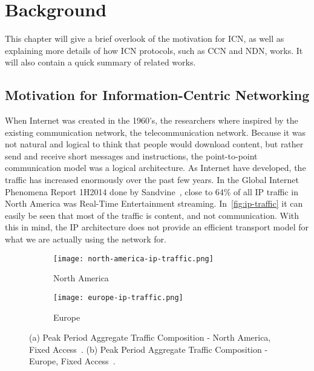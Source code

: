 \chapter{Background}\label{chp:background} 

This chapter will give a brief overlook of the motivation for \gls{ICN},
as well as explaining more details of how \gls{ICN} protocols, such as \gls{CCN} and \gls{NDN}, works. 
It will also contain a quick summary of related works.

\section{Motivation for Information-Centric Networking}
When Internet was created in the 1960's, the researchers where inspired by the existing communication network, the telecommunication network.
Because it was not natural and logical to think that people would download content, but rather send and receive short messages and instructions, the point-to-point communication model was a logical architecture. 
As Internet have developed, the traffic has increased enormously over the past few years. 
In the Global Internet Phenomena Report 1H2014 done by Sandvine~\cite{gipr2014}, close to 64\% of all \gls{IP} traffic in North America was Real-Time Entertainment streaming. 
In~\autoref{fig:ip-traffic} it can easily be seen that most of the traffic is content, and not communication.
With this in mind, the \gls{IP} architecture does not provide an efficient transport model for what we are actually using the network for.

\begin{figure}[ht]
  \centering
  \begin{subfigure}{0.48\textwidth}
    \centering
    \texttt{[image: north-america-ip-traffic.png]}
    \caption{North America}
    \label{fig:north-america-ip-traffic}
  \end{subfigure}

  \begin{subfigure}{0.48\textwidth}
    \centering
    \texttt{[image: europe-ip-traffic.png]}
    \caption{Europe}
    \label{fig:europe-ip-traffic}
  \end{subfigure}
  \caption{
  (a) Peak Period Aggregate Traffic Composition - North America, Fixed Access~\cite{gipr2014}.
  (b) Peak Period Aggregate Traffic Composition - Europe, Fixed Access~\cite{gipr2014}.
  }
  \label{fig:ip-traffic}
\end{figure}

